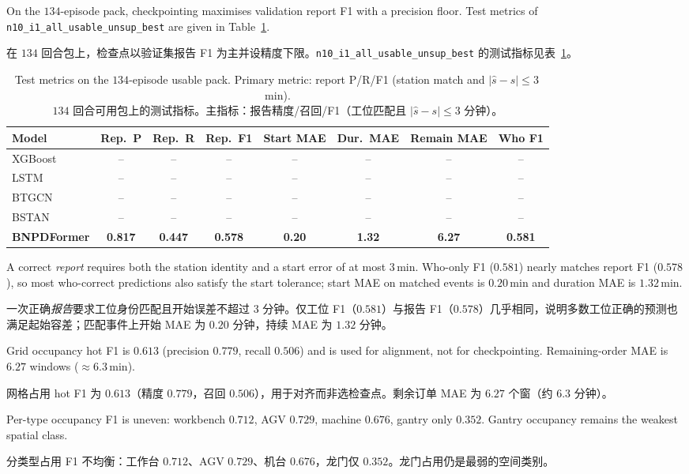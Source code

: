 \documentclass[12pt,a4paper,oneside,scheme=plain]{ctexrep}
\newcommand{\bip}[2]{%
  \par #1\par
  \nobreak\vspace{0.12em}%
  {\small\color{black!62}#2}\par
  \vspace{0.62em}%
}
\begin{document}
\bip
{On the $134$-episode pack, checkpointing maximises validation report F1 with a precision floor. Test metrics of \texttt{n10\_i1\_all\_usable\_unsup\_best} are given in Table~\ref{tab:results}.}
{在 $134$ 回合包上，检查点以验证集报告 F1 为主并设精度下限。\texttt{n10\_i1\_all\_usable\_unsup\_best} 的测试指标见表~\ref{tab:results}。}

\begin{table}[ht]
\centering
\footnotesize
\setlength{\tabcolsep}{3.5pt}
\caption{Test metrics on the $134$-episode usable pack. Primary metric: report P/R/F1 (station match and $|\hat{s}-s|\le 3$\,min).\\
{\small $134$ 回合可用包上的测试指标。主指标：报告精度/召回/F1（工位匹配且 $|\hat{s}-s|\le 3$ 分钟）。}}
\label{tab:results}
\begin{tabular}{lccccccc}
\toprule
Model & Rep.\ P & Rep.\ R & Rep.\ F1 & Start MAE & Dur.\ MAE & Remain MAE & Who F1 \\
\midrule
XGBoost & -- & -- & -- & -- & -- & -- & -- \\
LSTM & -- & -- & -- & -- & -- & -- & -- \\
BTGCN & -- & -- & -- & -- & -- & -- & -- \\
BSTAN & -- & -- & -- & -- & -- & -- & -- \\
\textbf{BNPDFormer} & \textbf{0.817} & \textbf{0.447} & \textbf{0.578} & \textbf{0.20} & \textbf{1.32} & \textbf{6.27} & \textbf{0.581} \\
\bottomrule
\end{tabular}
\end{table}

\bip
{A correct \emph{report} requires both the station identity and a start error of at most $3$\,min. Who-only F1 ($0.581$) nearly matches report F1 ($0.578$), so most who-correct predictions also satisfy the start tolerance; start MAE on matched events is $0.20$\,min and duration MAE is $1.32$\,min.}
{一次正确\emph{报告}要求工位身份匹配且开始误差不超过 $3$ 分钟。仅工位 F1（$0.581$）与报告 F1（$0.578$）几乎相同，说明多数工位正确的预测也满足起始容差；匹配事件上开始 MAE 为 $0.20$ 分钟，持续 MAE 为 $1.32$ 分钟。}

\bip
{Grid occupancy hot F1 is $0.613$ (precision $0.779$, recall $0.506$) and is used for alignment, not for checkpointing. Remaining-order MAE is $6.27$ windows ($\approx 6.3$\,min).}
{网格占用 hot F1 为 $0.613$（精度 $0.779$，召回 $0.506$），用于对齐而非选检查点。剩余订单 MAE 为 $6.27$ 个窗（约 $6.3$ 分钟）。}

\bip
{Per-type occupancy F1 is uneven: workbench $0.712$, AGV $0.729$, machine $0.676$, gantry only $0.352$. Gantry occupancy remains the weakest spatial class.}
{分类型占用 F1 不均衡：工作台 $0.712$、AGV $0.729$、机台 $0.676$，龙门仅 $0.352$。龙门占用仍是最弱的空间类别。}
\end{document}
